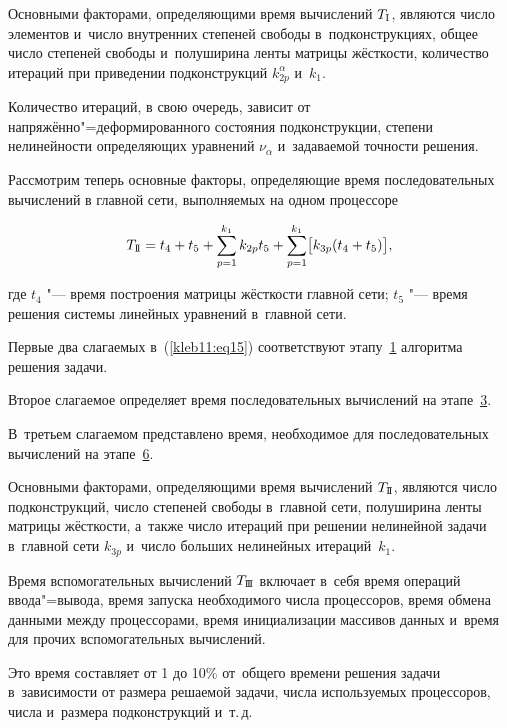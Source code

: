 Основными факторами, определяющими время вычислений $T_\text{\sc I}$, являются число элементов и~число внутренних степеней свободы в~подконструкциях, общее число степеней свободы и~полуширина ленты матрицы жёсткости, количество итераций при приведении подконструкций $k_{2p}^\alpha $ и~$k_1$. 

Количество итераций, в свою очередь, зависит от напряжённо"=деформированного состояния подконструкции, степени нелинейности определяющих уравнений $\nu_\alpha$ и~задаваемой точности решения.



Рассмотрим теперь основные факторы, определяющие время последовательных вычислений в главной сети, выполняемых на одном процессоре

\begin{equation}

\label{kleb11:eq17} T_\text{\sc I\!I} =t_4 + t_5 + \sum\limits_{p=1}^{k_1} k_{2p} t_5 + \sum \limits_{p=1}^{k_1} \bigl[ k_{3p}

( t_4 +t_5 ) \bigr],

\end{equation}

где $t_4$ "--- время построения матрицы жёсткости главной сети; $t_5$ "--- время решения системы линейных уравнений в~главной сети. 

Первые два слагаемых в~(\ref{kleb11:eq15}) соответствуют этапу~\hyperlink{et:1}{1} алгоритма решения задачи.

Второе слагаемое определяет время последовательных вычислений на этапе~\hyperlink{et:3}{3}. 

В~третьем слагаемом представлено время, необходимое для последовательных вычислений на этапе~\hyperlink{et:6}{6}.



Основными факторами, определяющими время вычислений $T_\text{\sc I\!I}$, являются число подконструкций, число степеней свободы в~главной сети, полуширина ленты матрицы жёсткости, а~также число итераций при решении нелинейной задачи в~главной сети $k_{3p}$ и~число больших нелинейных итераций~$k_1$.



Время вспомогательных вычислений $T_\text{\sc I\!I\!I}$ включает в~себя время операций ввода"=вывода, время запуска необходимого числа процессоров, время обмена данными между процессорами, время инициализации массивов данных и~время для прочих вспомогательных вычислений. 

Это время составляет от 1 до 10{\%} от~общего времени решения задачи в~зависимости от размера решаемой задачи, числа используемых процессоров, числа и~размера подконструкций и~т.\,д.

